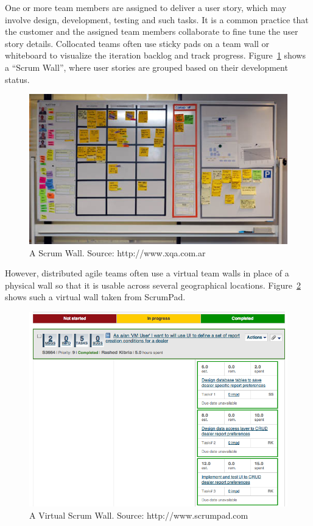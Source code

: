 One or more team members are assigned to deliver a user story, which may involve design, development, testing and such tasks. It is a common practice that the customer and the assigned team members collaborate to fine tune the user story details. Collocated teams often use sticky pads on a team wall or whiteboard to visualize the iteration backlog and track progress. Figure~\ref{fig:scrum_wall} shows a ``Scrum Wall'', where user stories are grouped based on their development status.

\begin{figure}[bt]
	\centering
	\includegraphics[width=\textwidth]{ScrumWall.jpg}
    \caption{A Scrum Wall. Source: http://www.xqa.com.ar}
	\label{fig:scrum_wall}
\end{figure}

However, distributed agile teams often use a virtual team walls in place of a physical wall so that it is usable across several geographical locations. Figure~\ref{fig:target_process_wall} shows such a virtual wall taken from ScrumPad.

\begin{figure}[bt]
	\centering
	\includegraphics[width=\textwidth]{ScrumPadWall.png}
    \caption{A Virtual Scrum Wall. Source: http://www.scrumpad.com}
	\label{fig:target_process_wall}
\end{figure}


